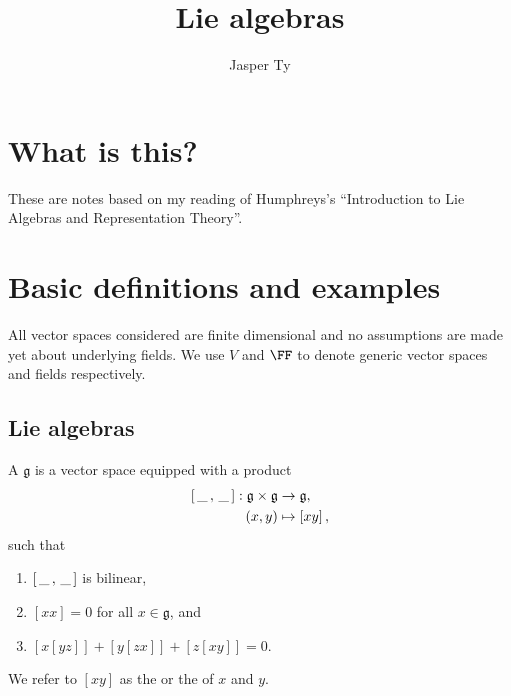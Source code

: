 \documentclass{article}
\title{Lie algebras}
\author{Jasper Ty}
\date{}
\newcommand*\wc{{\mkern 3mu\_\mkern 3mu}}
\newcommand{\lb}[1]{\ensuremath{\left[{#1}\right]}}
\newcommand{\frkg}{{\ensuremath{\mathfrak{g}}}}
\begin{document}
\maketitle

\section*{What is this?}

These are notes based on my reading of Humphreys's ``Introduction to Lie Algebras and Representation Theory''.

\tableofcontents

\newpage

\section{Basic definitions and examples}

\begin{convention}
    All vector spaces considered are finite dimensional and no assumptions are made yet about underlying fields.
    We use $V$ and $\FF$ to denote generic vector spaces and fields respectively.
\end{convention}

\subsection{Lie algebras}

\begin{definition}
    A  $\frkg$ is a vector space equipped with a product
    \begin{align*}
        \lb{\wc,\wc}: \frkg \times \frkg
        &\to
        \frkg,
        \\
        (x,y)
        &\mapsto
        \lb{xy},
    \end{align*}
    such that
    \begin{enumerate}[label=(L\arabic*)]
        \item 
            \label{ax:LBIsBilinear}
            $\lb{\wc,\wc}$ is bilinear,
        \item 
            \label{ax:LBNilpotent}
            $\lb{xx} = 0$ for all $x \in \frkg$, and
        \item 
            \label{ax:LBJacobiIdentity}
            $\lb{x\lb{yz}} + \lb{y\lb{zx}} + \lb{z\lb{xy}} = 0$.
    \end{enumerate}
    We refer to $\lb{xy}$ as the  or the  of $x$ and $y$.
\end{definition}
\end{document}
